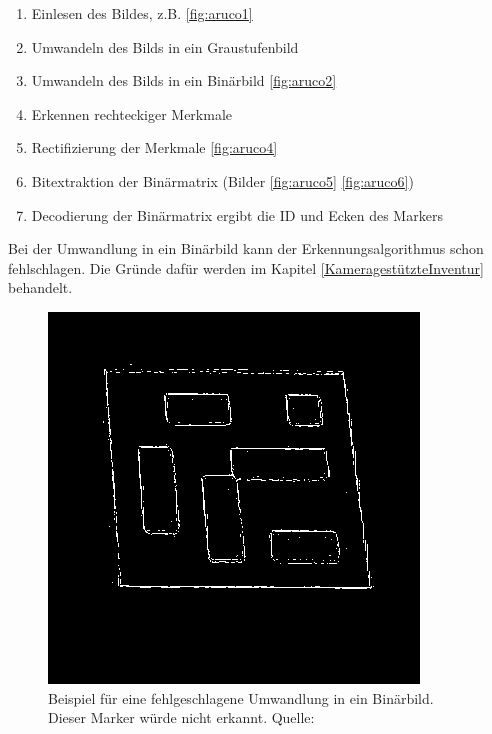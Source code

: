 \begin{enumerate}
    \item Einlesen des Bildes, z.B. \ref{fig:aruco1}
    \item Umwandeln des Bilds in ein Graustufenbild 
    \item Umwandeln des Bilds in ein Binärbild \ref{fig:aruco2}
    \item Erkennen rechteckiger Merkmale
    \item Rectifizierung der Merkmale \ref{fig:aruco4}
    \item Bitextraktion der Binärmatrix (Bilder \ref{fig:aruco5} \ref{fig:aruco6})
    \item Decodierung der Binärmatrix ergibt die ID und Ecken des Markers
\end{enumerate}

Bei der Umwandlung in ein Binärbild kann der Erkennungsalgorithmus schon fehlschlagen. Die Gründe dafür werden im Kapitel \ref{KameragestützteInventur}
behandelt.

\begin{figure}
    \caption{Beispiel für eine fehlgeschlagene Umwandlung in ein Binärbild. Dieser Marker würde nicht erkannt. Quelle: \cite[OpenCV]{OpenCVaruco}}\label{fig:aruco3}
    \includegraphics[width = \textwidth/2]{Bilder/singlemarkersbrokenthresh.png}
    \centering
\end{figure}

